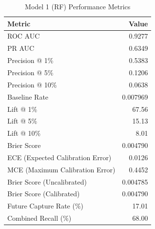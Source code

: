 \begin{table}[h]
\centering
\begin{tabular}{lr}
\toprule
Metric & Value \\
\midrule
ROC AUC & 0.9277 \\
PR AUC & 0.6349 \\
Precision @ 1\% & 0.5383 \\
Precision @ 5\% & 0.1206 \\
Precision @ 10\% & 0.0638 \\
Baseline Rate & 0.007969 \\
Lift @ 1\% & 67.56 \\
Lift @ 5\% & 15.13 \\
Lift @ 10\% & 8.01 \\
Brier Score & 0.004790 \\
ECE (Expected Calibration Error) & 0.0126 \\
MCE (Maximum Calibration Error) & 0.4452 \\
Brier Score (Uncalibrated) & 0.004785 \\
Brier Score (Calibrated) & 0.004790 \\
Future Capture Rate (\%) & 17.01 \\
Combined Recall (\%) & 68.00 \\
\bottomrule
\end{tabular}
\caption{Model 1 (RF) Performance Metrics}
\label{tab:model1_rf_metrics}
\end{table}
